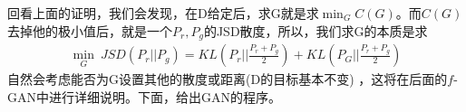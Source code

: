             \par
            回看上面的证明，我们会发现，在D给定后，求G就是求$\min _G C(G)$。而$C(G)$去掉他的极小值后，就是一个$P_r,P_g$的JSD散度，所以，我们求G的本质是求
            \begin{align*}
            \min _G\ JSD(P_r||P_g) = KL \left( P_r\Big|\Big| \frac{P_r+P_g}{2} \right) + KL \left( P_G\Big|\Big| \frac{P_r+P_g}{2} \right)
            \end{align*}
            自然会考虑能否为G设置其他的散度或距离(D的目标基本不变)
            ，这将在后面的$f$-GAN中进行详细说明。下面，给出GAN的程序。
